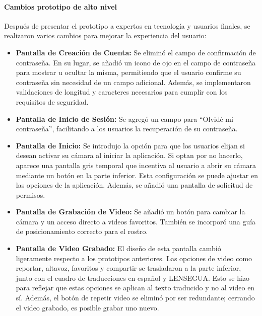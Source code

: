 \paragraph{Cambios prototipo de alto nivel}

Después de presentar el prototipo a expertos en tecnología y usuarios finales, se realizaron varios cambios para mejorar la experiencia del usuario:

\begin{itemize}
    \item \textbf{Pantalla de Creación de Cuenta:} Se eliminó el campo de confirmación de contraseña. En su lugar, se añadió un icono de ojo en el campo de contraseña para mostrar u ocultar la misma, permitiendo que el usuario confirme su contraseña sin necesidad de un campo adicional. Además, se implementaron validaciones de longitud y caracteres necesarios para cumplir con los requisitos de seguridad.
    
    \item \textbf{Pantalla de Inicio de Sesión:} Se agregó un campo para ``Olvidé mi contraseña'', facilitando a los usuarios la recuperación de su contraseña.
    
    \item \textbf{Pantalla de Inicio:} Se introdujo la opción para que los usuarios elijan si desean activar su cámara al iniciar la aplicación. Si optan por no hacerlo, aparece una pantalla gris temporal que incentiva al usuario a abrir su cámara mediante un botón en la parte inferior. Esta configuración se puede ajustar en las opciones de la aplicación. Además, se añadió una pantalla de solicitud de permisos.
    
    \item \textbf{Pantalla de Grabación de Video:} Se añadió un botón para cambiar la cámara y un acceso directo a videos favoritos. También se incorporó una guía de posicionamiento correcto para el rostro.
    
    \item \textbf{Pantalla de Video Grabado:} El diseño de esta pantalla cambió ligeramente respecto a los prototipos anteriores. Las opciones de video como reportar, altavoz, favoritos y compartir se trasladaron a la parte inferior, junto con el cuadro de traducciones en español y LENSEGUA. Esto se hizo para reflejar que estas opciones se aplican al texto traducido y no al video en sí. Además, el botón de repetir video se eliminó por ser redundante; cerrando el video grabado, es posible grabar uno nuevo.
    

\end{itemize}
